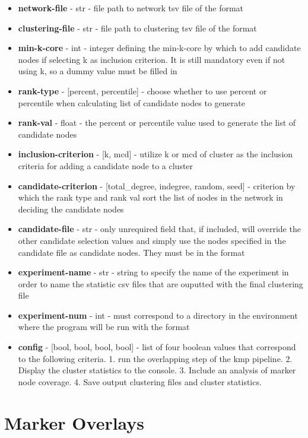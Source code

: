 \documentclass[12pt, oneside]{article}   	%
\begin{document}
\begin{itemize}
\item \textbf{network-file} - str  - file path to network tsv file of the format 
\item \textbf{clustering-file} - str - file path to clustering tsv file of the format 
\item \textbf{min-k-core} - int - integer defining the min-k-core by which to add candidate nodes if selecting k as inclusion criterion. It is still mandatory even if not using k, so a dummy value must be filled in
\item \textbf{rank-type} - [percent, percentile] - choose whether to use percent or percentile when calculating list of candidate nodes to generate
\item \textbf{rank-val} - float - the percent or percentile value used to generate the list of candidate nodes
\item \textbf{inclusion-criterion} - [k, mcd] - utilize k or mcd of cluster as the inclusion criteria for adding a candidate node to a cluster
\item \textbf{candidate-criterion} - [total\_degree, indegree, random, seed] - criterion by which the rank type and rank val sort the list of nodes in the network in deciding the candidate nodes
\item \textbf{candidate-file} - str - only unrequired field that, if included, will override the other candidate selection values and simply use the nodes specified in the candidate file as candidate nodes. They must be in the format 
    \item \textbf{experiment-name} - str - string to specify the name of the experiment in order to name the statistic csv files that are ouputted with the final clustering file
    \item \textbf{experiment-num} - int - must correspond to a directory in the environment where the program will be run with the format 
    \item \textbf{config} - [bool, bool, bool, bool] - list of four boolean values that correspond to the following criteria. 1. run the overlapping step of the kmp pipeline. 2. Display the cluster statistics to the console. 3. Include an analysis of marker node coverage. 4. Save output clustering files and cluster statistics. 
\end{itemize}

\clearpage
\section*{Marker Overlays}
\end{document}
